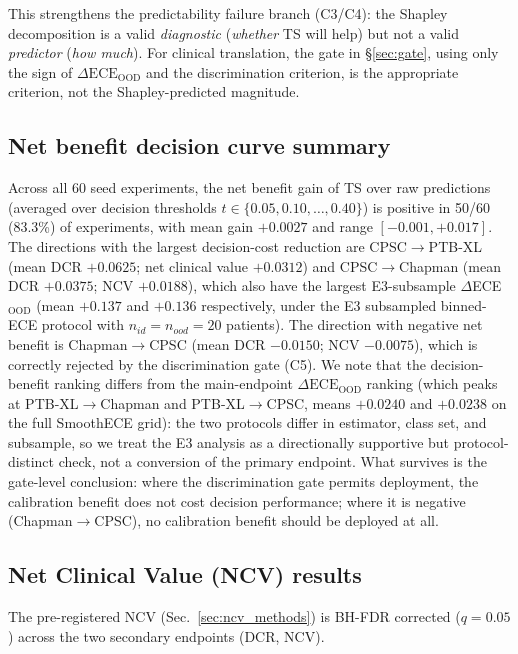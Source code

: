 \documentclass[review,12pt,nonatbib]{elsarticle}
\begin{document}
This strengthens the predictability failure branch (C3/C4): the
Shapley decomposition is a valid \emph{diagnostic} (\emph{whether} TS
will help) but not a valid \emph{predictor} (\emph{how much}). For
clinical translation, the gate in \S\ref{sec:gate}, using only the
sign of $\Delta\text{ECE}_{\text{OOD}}$ and the discrimination
criterion, is the appropriate criterion, not the Shapley-predicted
magnitude.

\subsection{Net benefit decision curve summary}
\label{sec:net_benefit_summary}
Across all 60 seed experiments, the net benefit gain of TS over raw
predictions (averaged over decision thresholds $t \in \{0.05, 0.10,
\ldots, 0.40\}$) is positive in 50/60 (83.3\%) of experiments, with
mean gain $+0.0027$ and range $[-0.001, +0.017]$. The directions with
the largest decision-cost reduction are CPSC$\rightarrow$PTB-XL
(mean DCR $+0.0625$; net clinical value $+0.0312$) and
CPSC$\rightarrow$Chapman (mean DCR $+0.0375$; NCV $+0.0188$), which
also have the largest E3-subsample $\Delta$ECE$_{\text{OOD}}$ (mean
$+0.137$ and $+0.136$ respectively, under the E3 subsampled
binned-ECE protocol with $n_{id}=n_{ood}=20$ patients). The direction
with negative net benefit is Chapman$\rightarrow$CPSC (mean DCR
$-0.0150$; NCV $-0.0075$), which is correctly rejected by the
discrimination gate (C5). We note that the decision-benefit ranking
differs from the main-endpoint $\Delta\text{ECE}_{\text{OOD}}$ ranking
(which peaks at PTB-XL$\rightarrow$Chapman and PTB-XL$\rightarrow$CPSC,
means $+0.0240$ and $+0.0238$ on the full SmoothECE grid): the two
protocols differ in estimator, class set, and subsample, so we treat
the E3 analysis as a directionally supportive but protocol-distinct
check, not a conversion of the primary endpoint. What survives is the
gate-level conclusion: where the discrimination gate permits
deployment, the calibration benefit does not cost decision
performance; where it is negative (Chapman$\rightarrow$CPSC), no
calibration benefit should be deployed at all.

\subsection{Net Clinical Value (NCV) results}
\label{sec:ncv_results}
The pre-registered NCV (Sec.~\ref{sec:ncv_methods}) is BH-FDR corrected
($q=0.05$) across the two secondary endpoints (DCR, NCV).
\end{document}
